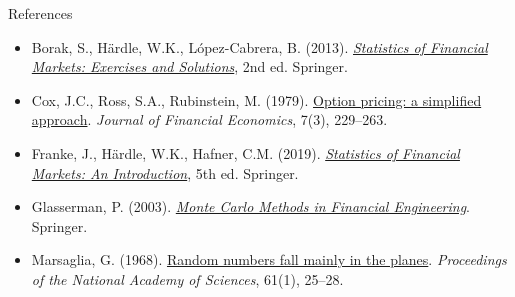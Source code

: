 \begin{frame}{References}
\itemsize{\tiny}
\begin{itemize}
    \item Borak, S., Härdle, W.K., López-Cabrera, B. (2013). \href{https://doi.org/10.1007/978-3-642-33929-5}{\textit{Statistics of Financial Markets: Exercises and Solutions}}, 2nd ed. Springer.
    \item Cox, J.C., Ross, S.A., Rubinstein, M. (1979). \href{https://doi.org/10.1016/0304-405X(79)90015-1}{Option pricing: a simplified approach}. \textit{Journal of Financial Economics}, 7(3), 229--263.
    \item Franke, J., Härdle, W.K., Hafner, C.M. (2019). \href{https://doi.org/10.1007/978-3-030-13751-9}{\textit{Statistics of Financial Markets: An Introduction}}, 5th ed. Springer.
    \item Glasserman, P. (2003). \href{https://doi.org/10.1007/978-0-387-21617-1}{\textit{Monte Carlo Methods in Financial Engineering}}. Springer.
    \item Marsaglia, G. (1968). \href{https://doi.org/10.1073/pnas.61.1.25}{Random numbers fall mainly in the planes}. \textit{Proceedings of the National Academy of Sciences}, 61(1), 25--28.
\end{itemize}
\end{frame}


